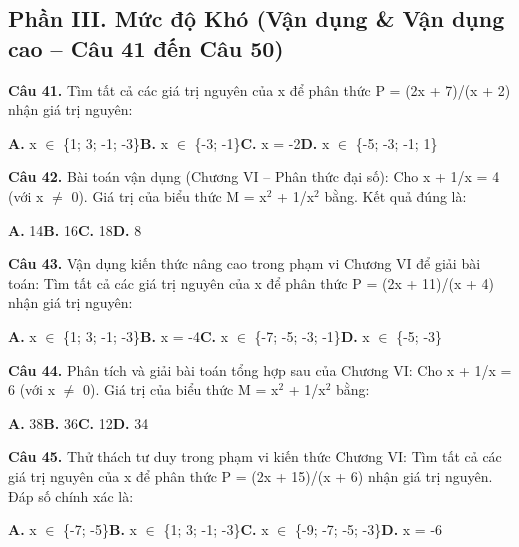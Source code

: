 \documentclass[11pt,a4paper]{article}
\begin{document}
\subsection*{\color{accent} Phần III. Mức độ Khó (Vận dụng \& Vận dụng cao -- Câu 41 đến Câu 50)}
\textbf{\color{primary} Câu 41.} Tìm tất cả các giá trị nguyên của x để phân thức P = (2x + 7)/(x + 2) nhận giá trị nguyên:\par
\hspace*{1.5em}\textbf{A.} x $\in$ \{1; 3; -1; -3\}\quad\quad \textbf{B.} x $\in$ \{-3; -1\}\quad\quad \textbf{C.} x = -2\quad\quad \textbf{D.} x $\in$ \{-5; -3; -1; 1\}\par\vspace{2pt}
\textbf{\color{primary} Câu 42.} Bài toán vận dụng (Chương VI – Phân thức đại số): Cho x + 1/x = 4 (với x $\ne$ 0). Giá trị của biểu thức M = x$^2$ + 1/x$^2$ bằng. Kết quả đúng là:\par
\hspace*{1.5em}\textbf{A.} 14\quad\quad \textbf{B.} 16\quad\quad \textbf{C.} 18\quad\quad \textbf{D.} 8\par\vspace{2pt}
\textbf{\color{primary} Câu 43.} Vận dụng kiến thức nâng cao trong phạm vi Chương VI để giải bài toán: Tìm tất cả các giá trị nguyên của x để phân thức P = (2x + 11)/(x + 4) nhận giá trị nguyên:\par
\hspace*{1.5em}\textbf{A.} x $\in$ \{1; 3; -1; -3\}\quad\quad \textbf{B.} x = -4\quad\quad \textbf{C.} x $\in$ \{-7; -5; -3; -1\}\quad\quad \textbf{D.} x $\in$ \{-5; -3\}\par\vspace{2pt}
\textbf{\color{primary} Câu 44.} Phân tích và giải bài toán tổng hợp sau của Chương VI: Cho x + 1/x = 6 (với x $\ne$ 0). Giá trị của biểu thức M = x$^2$ + 1/x$^2$ bằng:\par
\hspace*{1.5em}\textbf{A.} 38\quad\quad \textbf{B.} 36\quad\quad \textbf{C.} 12\quad\quad \textbf{D.} 34\par\vspace{2pt}
\textbf{\color{primary} Câu 45.} Thử thách tư duy trong phạm vi kiến thức Chương VI: Tìm tất cả các giá trị nguyên của x để phân thức P = (2x + 15)/(x + 6) nhận giá trị nguyên. Đáp số chính xác là:\par
\hspace*{1.5em}\textbf{A.} x $\in$ \{-7; -5\}\quad\quad \textbf{B.} x $\in$ \{1; 3; -1; -3\}\quad\quad \textbf{C.} x $\in$ \{-9; -7; -5; -3\}\quad\quad \textbf{D.} x = -6\par\vspace{2pt}
\end{document}
